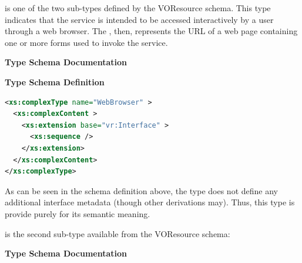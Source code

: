 \documentclass[11pt,a4paper]{ivoa}
\begin{document}
 is one of the two 
sub-types defined by the VOResource schema.  This type indicates that
the service is intended to be accessed interactively by a user through
a web browser.  The , then, represents
the URL of a web page containing one or more forms used to invoke the
service. 


\begingroup
      	\renewcommand*\descriptionlabel[1]{%
      	\hbox to 5.5em{\emph{#1}\hfil}}\vspace{2ex}\noindent\textbf{ Type Schema Documentation}



\vspace{1ex}\noindent\textbf{ Type Schema Definition}

\begin{lstlisting}[language=XML,basicstyle=\footnotesize]
<xs:complexType name="WebBrowser" >
  <xs:complexContent >
    <xs:extension base="vr:Interface" >
      <xs:sequence />
    </xs:extension>
  </xs:complexContent>
</xs:complexType>
\end{lstlisting}\endgroup


As can be seen in the schema definition above, the
 type does not define any additional
interface metadata (though other  derivations
may).  Thus, this type is provide purely for its semantic meaning.  



 is the second 
sub-type available from the VOResource schema:

\begingroup
      	\renewcommand*\descriptionlabel[1]{%
      	\hbox to 5.5em{\emph{#1}\hfil}}\vspace{2ex}\noindent\textbf{ Type Schema Documentation}

\end{document}
